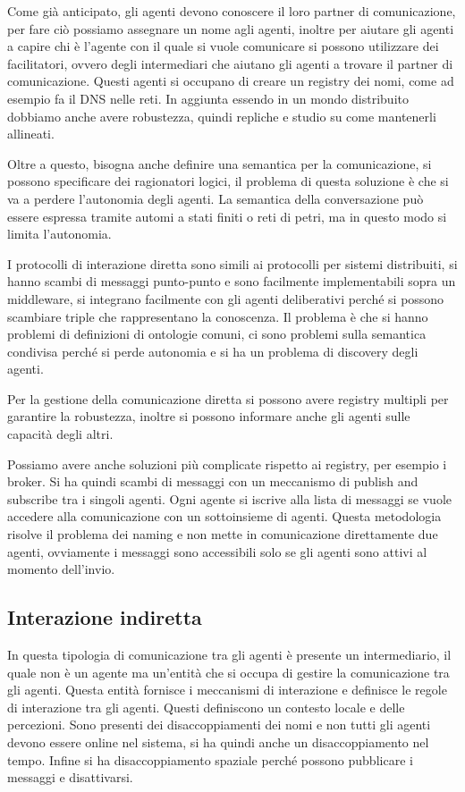 Come già anticipato, gli agenti devono conoscere il loro partner di comunicazione,
per fare ciò possiamo assegnare un nome agli agenti, inoltre per aiutare gli
agenti a capire chi è l'agente con il quale si vuole comunicare si possono
utilizzare dei facilitatori, ovvero degli intermediari che aiutano gli agenti
a trovare il partner di comunicazione. Questi agenti si occupano di creare un
registry dei nomi, come ad esempio fa il DNS nelle reti. In aggiunta essendo in
un mondo distribuito dobbiamo anche avere robustezza, quindi repliche e studio
su come mantenerli allineati.

Oltre a questo, bisogna anche definire una semantica per la comunicazione, si
possono specificare dei ragionatori logici, il problema di questa soluzione è
che si va a perdere l'autonomia degli agenti. La semantica della conversazione 
può essere espressa tramite automi a stati finiti o reti di petri, ma in questo 
modo si limita l'autonomia.

I protocolli di interazione diretta sono simili ai protocolli per sistemi distribuiti,
si hanno scambi di messaggi punto-punto e sono facilmente implementabili sopra
un middleware, si integrano facilmente con gli agenti deliberativi perché si 
possono scambiare triple che rappresentano la conoscenza. Il problema è che si 
hanno problemi di definizioni di ontologie comuni, ci sono problemi sulla semantica 
condivisa perché si perde autonomia e si ha un problema di discovery degli agenti.

Per la gestione della comunicazione diretta si possono avere registry multipli
per garantire la robustezza, inoltre si possono informare anche gli agenti sulle
capacità degli altri.

Possiamo avere anche soluzioni più complicate rispetto ai registry, per esempio 
i broker. Si ha quindi scambi di messaggi con un meccanismo di publish and subscribe 
tra i singoli agenti. Ogni agente si iscrive alla lista di messaggi se vuole 
accedere alla comunicazione con un sottoinsieme di agenti. Questa metodologia 
risolve il problema dei naming e non mette in comunicazione direttamente due 
agenti, ovviamente i messaggi sono accessibili solo se gli agenti sono attivi al 
momento dell'invio.
\subsection{Interazione indiretta}
In questa tipologia di comunicazione tra gli agenti è presente un intermediario,
il quale non è un agente ma un'entità che si occupa di gestire la comunicazione
tra gli agenti. Questa entità fornisce i meccanismi di interazione e
definisce le regole di interazione tra gli agenti. Questi definiscono un
contesto locale e delle percezioni. Sono presenti dei disaccoppiamenti
dei nomi e non tutti gli agenti devono essere online nel sistema, si ha quindi
anche un disaccoppiamento nel tempo. Infine si ha disaccoppiamento spaziale
perché possono pubblicare i messaggi e disattivarsi.
